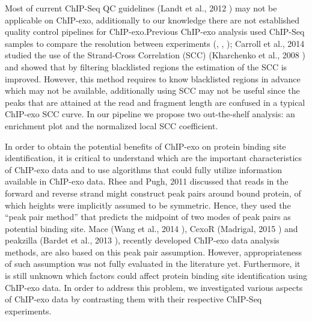 \documentclass[11pt]{article}\usepackage[]{graphicx}\usepackage[]{color}
\begin{document}
Most of current ChIP-Seq QC guidelines (Landt et al., 2012
\cite{encode_qc}) may not be applicable on ChIP-exo, additionally to
our knowledge there are not established quality control pipelines for
ChIP-exo.Previous ChIP-exo analysis used ChIP-Seq samples to compare
the resolution between experiments (\cite{exo1}, \cite{exo2},
\cite{exoillumina}); Carroll et al., 2014 \cite{carroll.qc} studied
the use of the Strand-Cross Correlation (SCC) (Kharchenko et al., 2008
\cite{strandcc}) and showed that by filtering blacklisted regions the
estimation of the SCC is improved. However, this method requires to
know blacklisted regions in advance which may not be available,
additionally using SCC may not be useful since the peaks that are
attained at the read and fragment length are confused in a typical
ChIP-exo SCC curve.  In our pipeline we propose two out-the-shelf
analysis: an enrichment plot and the normalized local SCC coefficient.

In order to obtain the potential benefits of ChIP-exo on protein
binding site identification, it is critical to understand which are
the important characteristics of ChIP-exo data and to use algorithms
that could fully utilize information available in ChIP-exo data. Rhee
and Pugh, 2011 \cite{exo1} discussed that reads in the forward and
reverse strand might construct peak pairs around bound protein, of
which heights were implicitly assumed to be symmetric. Hence, they
used the ``peak pair method'' that predicts the midpoint of two modes
of peak pairs as potential binding site. Mace (Wang et al., 2014
\cite{mace}), CexoR (Madrigal, 2015 \cite{cexor}) and peakzilla
(Bardet et al., 2013 \cite{peakzilla}), recently developed ChIP-exo
data analysis methods, are also based on this peak pair
assumption. However, appropriateness of such assumption was not fully
evaluated in the literature yet.  Furthermore, it is still unknown
which factors could affect protein binding site identification using
ChIP-exo data. In order to address this problem, we investigated
various aspects of ChIP-exo data by contrasting them with their
respective ChIP-Seq experiments.
\end{document}
